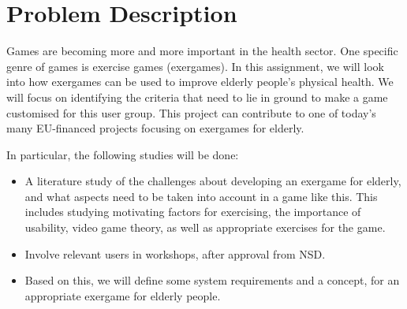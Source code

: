 \documentclass[b5paper,twoside,openright,11pt]{report}
\begin{document}
\cleardoublepage
\chapter*{Problem Description}
Games are becoming more and more important in the health sector. One specific genre of games is exercise games (exergames). In this assignment, we will look into how exergames can be used to improve elderly people's physical health. We will focus on identifying the criteria that need to lie in ground to make a game customised for this user group. This project can contribute to one of today's many EU-financed projects focusing on exergames for elderly.

In particular, the following studies will be done:
\begin{itemize}
\item A literature study of the challenges about developing an exergame for elderly, and what aspects need to be taken into account in a game like this. This includes studying motivating factors for exercising, the importance of usability, video game theory, as well as appropriate exercises for the game.
\item Involve relevant users in workshops, after approval from NSD.
\item Based on this, we will define some system requirements and a concept, for an appropriate exergame for elderly people.\\ 
\end{itemize}
\end{document}
